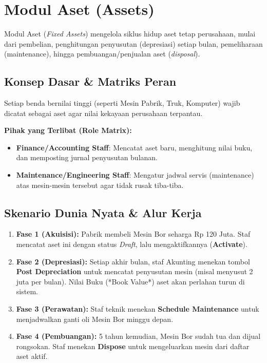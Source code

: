\chapter{Modul Aset (Assets)}

Modul Aset (\textit{Fixed Assets}) mengelola siklus hidup aset tetap perusahaan, mulai dari pembelian, penghitungan penyusutan (depresiasi) setiap bulan, pemeliharaan (maintenance), hingga pembuangan/penjualan aset (\textit{disposal}).

\section{Konsep Dasar \& Matriks Peran}
Setiap benda bernilai tinggi (seperti Mesin Pabrik, Truk, Komputer) wajib dicatat sebagai aset agar nilai kekayaan perusahaan terpantau.

\textbf{Pihak yang Terlibat (Role Matrix):}
\begin{itemize}
    \item \textbf{Finance/Accounting Staff}: Mencatat aset baru, menghitung nilai buku, dan memposting jurnal penyusutan bulanan.
    \item \textbf{Maintenance/Engineering Staff}: Mengatur jadwal servis (maintenance) atas mesin-mesin tersebut agar tidak rusak tiba-tiba.
\end{itemize}

\section{Skenario Dunia Nyata \& Alur Kerja}
\begin{enumerate}
    \item \textbf{Fase 1 (Akuisisi):} Pabrik membeli Mesin Bor seharga Rp 120 Juta. Staf mencatat aset ini dengan status \textit{Draft}, lalu mengaktifkannya (\textbf{Activate}).
    \item \textbf{Fase 2 (Depresiasi):} Setiap akhir bulan, staf Akunting menekan tombol \textbf{Post Depreciation} untuk mencatat penyusutan mesin (misal menyusut 2 juta per bulan). Nilai Buku (*Book Value*) aset akan perlahan turun di sistem.
    \item \textbf{Fase 3 (Perawatan):} Staf teknik menekan \textbf{Schedule Maintenance} untuk menjadwalkan ganti oli Mesin Bor minggu depan.
    \item \textbf{Fase 4 (Pembuangan):} 5 tahun kemudian, Mesin Bor sudah tua dan dijual rongsokan. Staf menekan \textbf{Dispose} untuk mengeluarkan mesin dari daftar aset aktif.
\end{enumerate}

